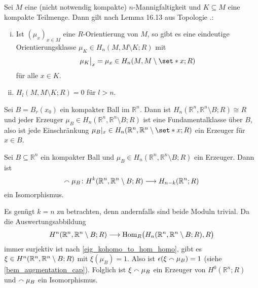 \begin{erinnerungA}[{name=[Orientierungsklassen für kompakte Teilmengen]}]
	Sei $M$ eine (nicht notwendig kompakte) $n$-Mannigfaltigkeit und $K \subseteq M$ eine kompakte Teilmenge. Dann gilt nach Lemma 16.13 aus Topologie .:
	\begin{enumerate}[(i)]
		\item Ist $(\mu_x)_{x \in M}$ eine $R$-Orientierung von $M$, so gibt es eine eindeutige Orientierungsklasse $\mu_K \in H_n(M,M \setminus K;R)$ mit 
		\[
			\mu_K\big|_x = \mu_x \in H_n(M,M \setminus \set*{x};R)
		\]
		für alle $x \in K$.
		\item $H_l(M, M \setminus K;R)=0$ für $l>n$.
	\end{enumerate}
\end{erinnerungA}

\begin{beispiel}[{name=[Fundamentalklasse eines kompakten Balls]}]
	Sei $B=B_r(x_0)$ ein kompakter Ball im $\mathbb{R}^n$. 
	Dann ist $H_n(\mathbb{R}^n,\mathbb{R}^n \setminus B;R) \cong R$ und jeder Erzeuger $\mu_B \in H_n(\mathbb{R}^n,\mathbb{R}^n \setminus B;R)$ ist eine Fundamentalklasse über $B$, also ist jede Einschränkung $\mu_B|_x \in H_n(\mathbb{R}^n,\mathbb{R}^n \setminus \set*{x};R)$ ein Erzeuger für $x \in B$.
\end{beispiel}

\begin{lemma}[{name=[Isomorphismus von Kohomologie und Homologie für kompakte Bälle]},label=Rn_kompakteBaelle]
	Sei $B \subseteq \mathbb{R}^n$ ein kompakter Ball und $\mu_B \in H_n(\mathbb{R}^n,\mathbb{R}^n \setminus B;R)$ ein Erzeuger. Dann ist 
	\[
		\capp \mu_B \colon H^k \enbrace*{\mathbb{R}^n,\mathbb{R}^n \setminus B;R} \longrightarrow H_{n-k}(\mathbb{R}^n;R)
	\]
	ein Isomorphismus.
\end{lemma}
\begin{beweis}
	Es genügt $k=n$ zu betrachten, denn andernfalls sind beide Moduln trivial. Da die Auswertungsabbildung 
	\[
		H^n(\mathbb{R}^n,\mathbb{R}^n \setminus B;R) \longrightarrow \Hom_R \enbrace[\big]{H_n(\mathbb{R}^n,\mathbb{R}^n \setminus B;R),R}
	\]
	immer surjektiv ist nach \autoref{eig_kohomo_to_hom_homo}, gibt es $\xi \in H^n \enbrace*{\mathbb{R}^n,\mathbb{R}^n \setminus B;R}$ mit $\xi(\mu_B)=1$. 
	Also ist $\epsilon(\xi \capp \mu_B)=1$ (siehe \ref{bem_augmentation_cap}). 
	Folglich ist $\xi \capp \mu_B$ ein Erzeuger von $H^0(\mathbb{R}^n;R)$ und $\capp \mu_B$ ein Isomorphismus.
\end{beweis}

